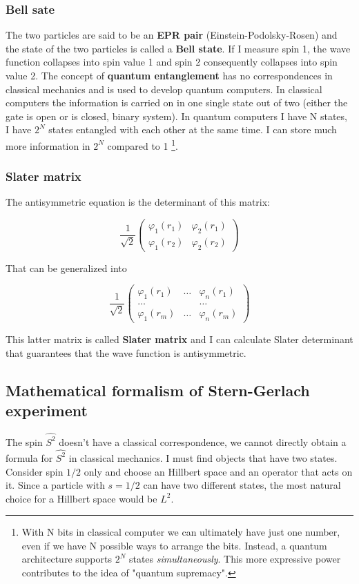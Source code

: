 		\subsubsection{Bell sate}
		The two particles are said to be an \textbf{EPR pair} (Einstein-Podolsky-Rosen) and the state of the two particles is called a \textbf{Bell state}.
		If I measure spin 1, the wave function collapses into spin value 1 and spin 2 consequently collapses into spin value 2.
		The concept of \textbf{quantum entanglement} has no correspondences in classical mechanics and is used to develop quantum computers.
		In classical computers the information is carried on in one single state out of two (either the gate is open or is closed, binary system).
	In quantum computers I have N states, I have $2^N$ states entangled with each other at the same time.
	I can store much more information in $2^N$ compared to 1 \footnote{With N bits in classical computer we can ultimately have just one number, even if we have N possible ways to arrange the bits.
																																		Instead, a quantum architecture supports $2^N$ states \textit{simultaneously}.
																																		This more expressive power contributes to the idea of "quantum supremacy".}.

		\subsubsection{Slater matrix}
		The antisymmetric equation is the determinant of this matrix:

		$$\frac{1}{\sqrt{2}}\begin{pmatrix}\varphi_1(r_1)&\varphi_2(r_1)\\\varphi_1(r_2)&\varphi_2(r_2)\end{pmatrix}$$

		That can be generalized into

 		$$\frac{1}{\sqrt{2}}\begin{pmatrix} \varphi_1(r_1)&\dots&\varphi_n(r_1)\\\dots& &\dots\\ \varphi_1(r_m)&\dots&\varphi_n(r_m) \end{pmatrix}$$

		This latter matrix is called \textbf{Slater matrix} and I can calculate Slater determinant that guarantees that the wave function is antisymmetric.

	\subsection{Mathematical formalism of Stern-Gerlach experiment}
	The spin $\hat{S^2}$ doesn't have a classical correspondence, we cannot directly obtain a formula for $\hat{S^2}$ in classical mechanics.
I must find objects that have two states.
	Consider spin $1/2$ only and choose an Hillbert space and an operator that acts on it.
Since a particle with $s=1/2$ can have two different states, the most natural choice for a Hillbert space would be \emph{$L^2$}.

